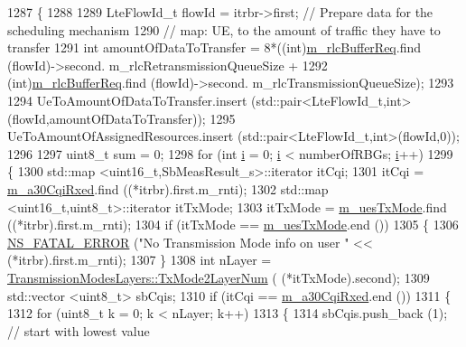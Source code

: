 \begin{DoxyCode}
1287     \{
1288 
1289       LteFlowId\_t flowId = itrbr->first;                \textcolor{comment}{// Prepare data for the scheduling mechanism}
1290       \textcolor{comment}{// map: UE, to the amount of traffic they have to transfer}
1291       \textcolor{keywordtype}{int} amountOfDataToTransfer =  8*((int)\hyperlink{classns3_1_1CqaFfMacScheduler_ae9f6c7fc32e6dd08573470c70d827610}{m\_rlcBufferReq}.find (flowId)->second.
      m\_rlcRetransmissionQueueSize +
1292                                        (int)\hyperlink{classns3_1_1CqaFfMacScheduler_ae9f6c7fc32e6dd08573470c70d827610}{m\_rlcBufferReq}.find (flowId)->second.
      m\_rlcTransmissionQueueSize);
1293 
1294       UeToAmountOfDataToTransfer.insert (std::pair<LteFlowId\_t,int>(flowId,amountOfDataToTransfer));
1295       UeToAmountOfAssignedResources.insert (std::pair<LteFlowId\_t,int>(flowId,0));
1296 
1297       uint8\_t sum = 0;
1298       \textcolor{keywordflow}{for} (\textcolor{keywordtype}{int} \hyperlink{bernuolliDistribution_8m_a6f6ccfcf58b31cb6412107d9d5281426}{i} = 0; \hyperlink{bernuolliDistribution_8m_a6f6ccfcf58b31cb6412107d9d5281426}{i} < numberOfRBGs; \hyperlink{bernuolliDistribution_8m_a6f6ccfcf58b31cb6412107d9d5281426}{i}++)
1299         \{
1300           std::map <uint16\_t,SbMeasResult\_s>::iterator itCqi;
1301           itCqi = \hyperlink{classns3_1_1CqaFfMacScheduler_a6894c40af99f8d6c6fdb201e7363fde9}{m\_a30CqiRxed}.find ((*itrbr).first.m\_rnti);
1302           std::map <uint16\_t,uint8\_t>::iterator itTxMode;
1303           itTxMode = \hyperlink{classns3_1_1CqaFfMacScheduler_ac556c4275bc3c2c078fd5856069ba0ca}{m\_uesTxMode}.find ((*itrbr).first.m\_rnti);
1304           \textcolor{keywordflow}{if} (itTxMode == \hyperlink{classns3_1_1CqaFfMacScheduler_ac556c4275bc3c2c078fd5856069ba0ca}{m\_uesTxMode}.end ())
1305             \{
1306               \hyperlink{group__fatal_ga5131d5e3f75d7d4cbfd706ac456fdc85}{NS\_FATAL\_ERROR} (\textcolor{stringliteral}{"No Transmission Mode info on user "} << (*itrbr).first.m\_rnti);
1307             \}
1308           \textcolor{keywordtype}{int} nLayer = \hyperlink{classns3_1_1TransmissionModesLayers_a31f608b7bfaa77440fe4cb85ad035329}{TransmissionModesLayers::TxMode2LayerNum} (
      (*itTxMode).second);
1309           std::vector <uint8\_t> sbCqis;
1310           \textcolor{keywordflow}{if} (itCqi == \hyperlink{classns3_1_1CqaFfMacScheduler_a6894c40af99f8d6c6fdb201e7363fde9}{m\_a30CqiRxed}.end ())
1311             \{
1312               \textcolor{keywordflow}{for} (uint8\_t k = 0; k < nLayer; k++)
1313                 \{
1314                   sbCqis.push\_back (1);                        \textcolor{comment}{// start with lowest value}

\end{DoxyCode}
